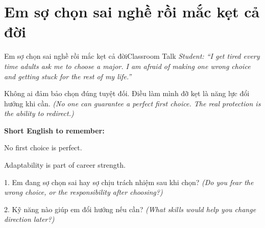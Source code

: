 \section{Em sợ chọn sai nghề rồi mắc kẹt cả đời}
\begin{truyen}{Em sợ chọn sai nghề rồi mắc kẹt cả đời}{Classroom Talk}
\textit{Student: ``I get tired every time adults ask me to choose a major. I am afraid of making one wrong choice and getting stuck for the rest of my life.''}\\[4pt]



\end{truyen}

\begin{baihoc}
Không ai đảm bảo chọn đúng tuyệt đối. Điều làm mình đỡ kẹt là năng lực đổi hướng khi cần.
\textit{(No one can guarantee a perfect first choice. The real protection is the ability to redirect.)}
\end{baihoc}

\begin{ghinhoanh}
\textbf{Short English to remember:}

No first choice is perfect.

Adaptability is part of career strength.
\end{ghinhoanh}

\begin{tuhocnhanh}
1. Em đang sợ chọn sai hay sợ chịu trách nhiệm sau khi chọn? \textit{(Do you fear the wrong choice, or the responsibility after choosing?)}

2. Kỹ năng nào giúp em đổi hướng nếu cần? \textit{(What skills would help you change direction later?)}
\end{tuhocnhanh}
\ngancach


